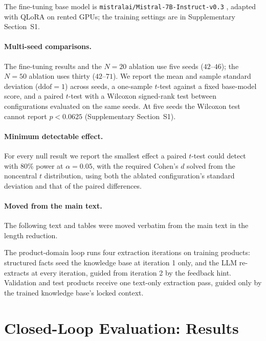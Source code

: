 \documentclass[11pt]{article}
\begin{document}
The fine-tuning base model is \texttt{mistralai/Mistral-7B-Instruct-v0.3}
\citep{jiang2023mistral}, adapted with QLoRA on rented GPUs; the
training settings are in Supplementary Section~S1.

\paragraph{Multi-seed comparisons.} The fine-tuning results and the
$N=20$ ablation use five seeds ($42$--$46$); the $N=50$ ablation uses
thirty ($42$--$71$). We report the mean and sample standard deviation
($\text{ddof}=1$) across seeds, a one-sample $t$-test against a fixed
base-model score, and a paired $t$-test with a Wilcoxon signed-rank test
between configurations evaluated on the same seeds. At five seeds the
Wilcoxon test cannot report $p<0.0625$ (Supplementary Section~S1).

\paragraph{Minimum detectable effect.} For every null result we report
the smallest effect a paired $t$-test could detect with 80\% power at
$\alpha=0.05$, with the required Cohen's $d$ solved from the noncentral
$t$ distribution, using both the ablated configuration's standard
deviation and that of the paired differences.



\paragraph{Moved from the main text.} The following text and tables were moved verbatim from the main text in the length reduction.

The product-domain loop runs four extraction iterations on training
products: structured facts seed the knowledge base at iteration 1 only,
and the LLM re-extracts at every iteration, guided from iteration 2 by
the feedback hint. Validation and test products receive one
text-only extraction pass, guided only by the trained knowledge base's
locked context.

\section{Closed-Loop Evaluation: Results}
\label{sec:s16}
\end{document}
